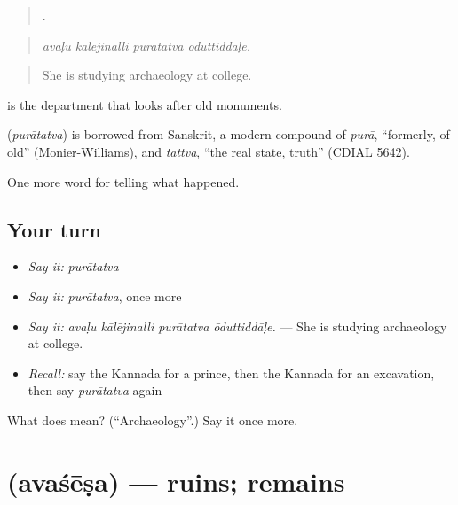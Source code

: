 \begin{quote}
   .
\end{quote}

\begin{quote}
\emph{avaḷu kālējinalli purātatva ōduttiddāḷe.}
\end{quote}

\begin{quote}
She is studying archaeology at college.
\end{quote}

  is the department that looks after old monuments.

\begin{cousinweb}
\textbf{} (\emph{purātatva}) is borrowed from Sanskrit, a modern compound of \emph{purā}, \textquotedblleft{}formerly, of old\textquotedblright{} (Monier-Williams), and \emph{tattva}, \textquotedblleft{}the real state, truth\textquotedblright{} (CDIAL 5642).
\end{cousinweb}

\begin{grammarlens}[title={What you've built}]
One more word for telling what happened.
\end{grammarlens}

\subsection*{Your turn}
\begin{itemize}
\raggedright
  \item \emph{Say it:} \emph{purātatva}
  \item \emph{Say it:} \emph{purātatva}, once more
  \item \emph{Say it:} \emph{avaḷu kālējinalli purātatva ōduttiddāḷe.} — She is studying archaeology at college.
  \item \emph{Recall:} say the Kannada for a prince, then the Kannada for an excavation, then say \emph{purātatva} again
\end{itemize}

\begin{tcolorbox}[breakable,colback=teal!4,colframe=teal!35!black,title={Before you move on}]
What does  mean? (\textquotedblleft{}Archaeology\textquotedblright{}.) Say it once more.
\end{tcolorbox}
\section[\texorpdfstring{\kn{ಅವಶೇಷ} (avaśēṣa)}{ಅವಶೇಷ (avaśēṣa)}]{ (avaśēṣa) — ruins; remains}

